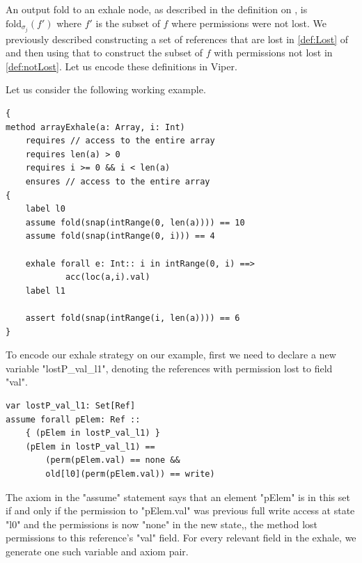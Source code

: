 \documentclass[msc,oneside]{ubcthesis}
\theoremstyle{definition}
\begin{document}
An output fold to an exhale node, as described in the definition on , is $\textrm{fold}_{\sigma_j}(f')$ where $f'$ is the subset of $f$ where permissions were not lost. We previously described constructing a set of references that are lost in \cref{def:Lost} of  and then using that to construct the subset of $f$ with permissions not lost in \cref{def:notLost}. Let us encode these definitions in Viper.

Let us consider the following working example.
\begin{lstlisting}[caption=Array Exhale Example]
{
method arrayExhale(a: Array, i: Int) 
    requires // access to the entire array
    requires len(a) > 0
    requires i >= 0 && i < len(a)
    ensures // access to the entire array
{
    label l0
    assume fold(snap(intRange(0, len(a)))) == 10 
    assume fold(snap(intRange(0, i))) == 4
    
    exhale forall e: Int:: i in intRange(0, i) ==> 
            acc(loc(a,i).val) 
    label l1

    assert fold(snap(intRange(i, len(a)))) == 6
}
\end{lstlisting}
To encode our exhale strategy on our example, first we need to declare a new variable "lostP_val_l1", denoting the references with permission lost to field "val".
\begin{lstlisting}
var lostP_val_l1: Set[Ref]
assume forall pElem: Ref ::
    { (pElem in lostP_val_l1) }
    (pElem in lostP_val_l1) ==
        (perm(pElem.val) == none &&
        old[l0](perm(pElem.val)) == write)
\end{lstlisting}
The axiom in the "assume" statement says that an element "pElem" is in this set if and only if the permission to "pElem.val" was previous full write access at state "l0" and the permissions is now "none" in the new state,\ie, the method lost permissions to this reference's "val" field. For every relevant field in the exhale, we generate one such variable and axiom pair.
\end{document}
